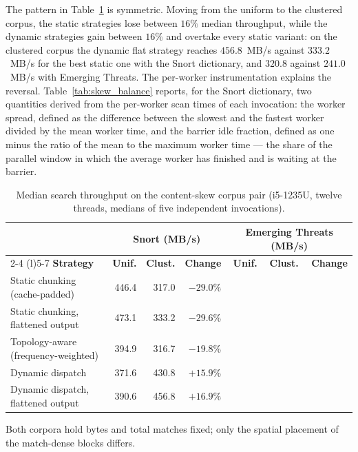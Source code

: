 The pattern in Table~\ref{tab:skew} is symmetric. Moving from the uniform to the
clustered corpus, the static strategies lose between $16\%$
median throughput, while the dynamic strategies gain between $16\%$
and overtake every static variant: on the clustered corpus the dynamic flat
strategy reaches $456.8$~MB/s against $333.2$~MB/s for the best static one with
the Snort dictionary, and $320.8$ against $241.0$~MB/s with Emerging Threats.
The per-worker instrumentation explains the reversal. Table~\ref{tab:skew_balance}
reports, for the Snort dictionary, two quantities derived from the per-worker
scan times of each invocation: the worker spread, defined as the difference
between the slowest and the fastest worker divided by the mean worker time, and
the barrier idle fraction, defined as one minus the ratio of the mean to the
maximum worker time --- the share of the parallel window in which the average
worker has finished and is waiting at the barrier.

\begin{table}[H]
    \centering
    \caption{Median search throughput on the content-skew corpus pair
    (i5-1235U, twelve threads, medians of five independent invocations).}
    \label{tab:skew}
    \small
    \setlength{\tabcolsep}{4.5pt}
    \begin{tabular}{@{} l rrr rrr @{}}
        \toprule
        & \multicolumn{3}{c}{\textbf{Snort (MB/s)}} & \multicolumn{3}{c}{\textbf{Emerging Threats (MB/s)}} \\
        \cmidrule(lr){2-4} \cmidrule(l){5-7}
        \textbf{Strategy} & \textbf{Unif.} & \textbf{Clust.} & \textbf{Change} & \textbf{Unif.} & \textbf{Clust.} & \textbf{Change} \\
        \midrule
        Static chunking (cache-padded)         & 446.4 & 317.0 & $-29.0\%$ \\
        Static chunking, flattened output      & 473.1 & 333.2 & $-29.6\%$ \\
        Topology-aware (frequency-weighted)    & 394.9 & 316.7 & $-19.8\%$ \\
        Dynamic dispatch                       & 371.6 & 430.8 & $+15.9\%$ \\
        Dynamic dispatch, flattened output     & 390.6 & 456.8 & $+16.9\%$ \\
        \bottomrule
    \end{tabular}

    {\footnotesize\raggedright Both corpora hold bytes and total matches fixed;
    only the spatial placement of the match-dense blocks differs.\par}
\end{table}

